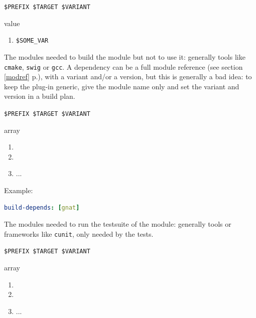 \documentclass[a4paper,12pt,twoside]{article}
\newcommand{\code}[1]{\texttt{#1}}
\newcommand{\seeref}[1]{see section \ref{#1} p.\pageref{#1}}
\begin{document}
\begin{description}[font=\large\texttt]
	\begin{description}[font=\textit,style=standard]
		\item[parameter] \tabto{2cm} \code{\$PREFIX \$TARGET \$VARIANT}
		\item[return] \tabto{2cm} value
		\begin{enumerate}
			\item \code{\$SOME\_VAR}
		\end{enumerate}
	\end{description}

	\item[build-depends {[}common|<variant>{]}] The modules needed to build the module but not to use it: generally tools like \code{cmake}, \code{swig} or \code{gcc}. A dependency can be a full module reference (\seeref{modref}), with a variant and/or a version, but this is generally a bad idea: to keep the plug-in generic, give the module name only and set the variant and version in a build plan.

	\begin{description}[font=\textit,style=standard]
		\item[parameter] \tabto{2cm} \code{\$PREFIX \$TARGET \$VARIANT}
		\item[return] \tabto{2cm} array
		\begin{enumerate}
			\item <module1>
			\item <module2>
			\item ...
		\end{enumerate}
	\end{description}

	Example:
	\begin{lstlisting}[language={yaml}]
build-depends: [gnat]
\end{lstlisting}

	\item[tests-depends {[}common|<variant>{]}] The modules needed to run the testsuite of the module: generally tools or frameworks like \code{cunit}, only needed by the tests.

	\begin{description}[font=\textit,style=standard]
		\item[parameter] \tabto{2cm} \code{\$PREFIX \$TARGET \$VARIANT}
		\item[return] \tabto{2cm} array
		\begin{enumerate}
			\item <module1>
			\item <module2>
			\item ...
		\end{enumerate}
	\end{description}


\end{description}
\end{document}
